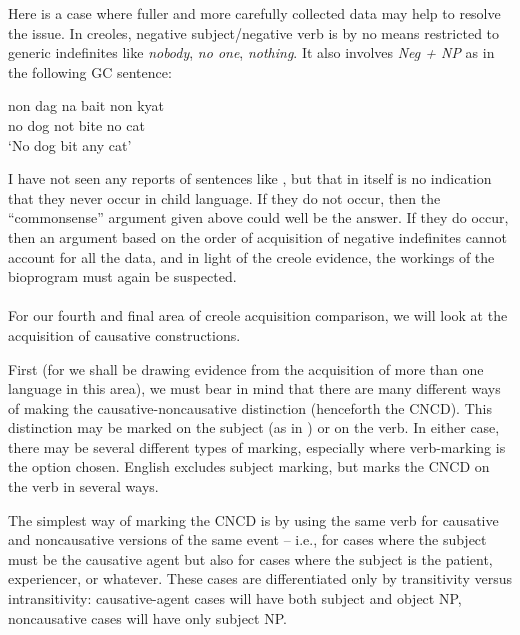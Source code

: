 Here is a case where fuller and more carefully collected data may help to resolve the issue. In creoles, negative subject/negative verb is by no means restricted to generic indefinites like \textit{nobody}, \textit{no one}, \textit{nothing}. It also involves \textit{Neg + NP} as in the following GC sentence:

\ea\label{ex:3:64}
\gll non dag na bait non kyat\\
no dog not bite no cat\\
\glt `No dog bit any cat'
\z


\noindent I have not seen any reports of sentences like , but that in itself is no indication that they never occur in child language. If they do not occur, then the ``commonsense'' argument given above could well be the answer. If they do occur, then an argument based on the order of acquisition of negative indefinites cannot account for all the data, and in light of the creole evidence, the workings of the bioprogram must again be suspected.\\\\

For our fourth and final area of creole acquisition comparison, we will look at the acquisition of causative constructions.

First (for we shall be drawing evidence from the acquisition of more than one language in this area), we must bear in mind that there are many different ways of making the causative-noncausative dis\-tinction (henceforth the CNCD). This distinction may be marked on the subject (as in ) or on the verb. In either case, there may be several different types of marking, especially where verb-marking is the option chosen. English excludes subject marking, but marks the CNCD on the verb in several ways.

The simplest way of marking the CNCD is by using the same verb for causative and noncausative versions of the same event -- i.e., for cases where the subject must be the causative agent but also for cases where the subject is the patient, experiencer, or whatever. These cases are differentiated only by transitivity versus intransitivity: causative-agent cases will have both subject and object NP, noncausative cases will have only subject NP.

